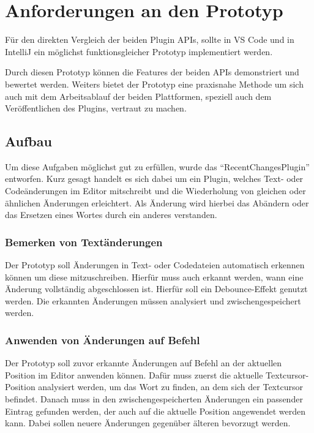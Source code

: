 \chapter{Anforderungen an den Prototyp}
\label{cha:Prototyp}

Für den direkten Vergleich der beiden Plugin APIs, sollte 
in VS Code und in IntelliJ ein möglichst funktionsgleicher 
Prototyp implementiert werden.

Durch diesen Prototyp können die Features der beiden APIs 
demonstriert und bewertet werden. Weiters bietet der Prototyp
eine praxisnahe Methode um sich auch mit dem Arbeitsablauf der
beiden Plattformen, speziell auch dem Veröffentlichen
des Plugins, vertraut zu machen.

\section{Aufbau}
\label{sec:Prototyp_Aufbau}

Um diese Aufgaben möglichst gut zu erfüllen, wurde das
\enquote{RecentChangesPlugin} entworfen. Kurz gesagt handelt
es sich dabei um ein Plugin, welches Text- oder Codeänderungen 
im Editor mitschreibt und die Wiederholung von gleichen oder
ähnlichen Änderungen erleichtert.
Als Änderung wird hierbei das Abändern oder das Ersetzen eines
Wortes durch ein anderes verstanden.

\subsection{Bemerken von Textänderungen}

Der Prototyp soll Änderungen in Text- oder Codedateien automatisch
erkennen können um diese mitzuschreiben. Hierfür muss auch erkannt
werden, wann eine Änderung vollständig abgeschlossen ist. Hierfür
soll ein Debounce-Effekt %
genutzt werden. Die erkannten Änderungen 
müssen analysiert und zwischengespeichert werden.

\subsection{Anwenden von Änderungen auf Befehl}

Der Prototyp soll zuvor erkannte Änderungen auf Befehl an der
aktuellen Position im Editor anwenden können. Dafür muss zuerst die
aktuelle Textcursor-Position analysiert werden, um das Wort zu finden,
an dem sich der Textcursor befindet. Danach muss in den 
zwischengespeicherten Änderungen ein passender Eintrag gefunden werden,
der auch auf die aktuelle Position angewendet werden kann.
Dabei sollen neuere Änderungen gegenüber älteren bevorzugt werden.

